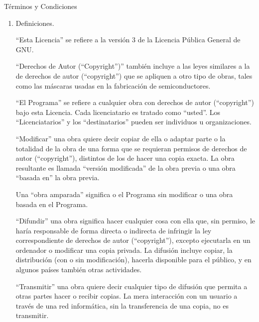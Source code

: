 {\begin{abstract}
Los t\'{e}rminos exactos y las condiciones para la copia, distribuci\'{o}n y 
modificaci\'{o}n se exponen a continuaci\'{o}n.  
\end{abstract}

\begin{center}
{\Large \sc T\'{e}rminos y Condiciones}
\end{center}


\begin{enumerate}

\addtocounter{enumi}{-1}

\item Definiciones.

``Esta Licencia'' se refiere a la versi\'{o}n 3 de la Licencia P\'{u}blica 
General de GNU.

``Derechos de Autor (``Copyright'')'' tambi\'{e}n incluye a las leyes similares a la de derechos de autor (``copyright'') 
que se apliquen a otro tipo de obras, tales como las m\'{a}scaras usadas 
en la fabricaci\'{o}n de semiconductores.

``El Programa'' se refiere a cualquier obra con derechos de autor (``copyright'') 
bajo esta Licencia.  Cada licenciatario es tratado como ``usted''. Los ``Licenciatarios'' y los ``destinatarios'' pueden ser individuos u organizaciones.

``Modificar'' una obra quiere decir copiar de ella o adaptar parte o la 
totalidad de la obra de una forma que se requieran permisos de derechos de autor (``copyright''), 
distintos de los de hacer una copia exacta. La obra resultante es 
llamada ``versi\'{o}n modificada'' de la obra previa o una obra ``basada en'' 
la obra previa.

Una ``obra amparada'' significa o el Programa sin modificar o una obra 
basada en el Programa.

``Difundir'' una obra significa hacer cualquier cosa con ella que, sin
permiso, le har\'{i}a responsable de forma directa o indirecta de infringir
la ley correspondiente de derechos de autor (``copyright''), excepto ejecutarla en un ordenador
o modificar una copia privada. La difusi\'{o}n incluye copiar, la 
distribuci\'{o}n (con o sin modificaci\'{o}n), hacerla disponible para el 
p\'{u}blico, y en algunos pa\'{i}ses tambi\'{e}n otras actividades.

``Transmitir'' una obra quiere decir cualquier tipo de difusi\'{o}n que 
permita a otras partes hacer o recibir copias.  La mera interacci\'{o}n con
un usuario a trav\'{e}s de una red inform\'{a}tica, sin la transferencia de una 
copia, no es transmitir.


\end{enumerate}}
